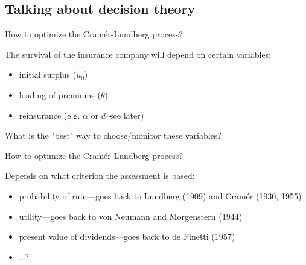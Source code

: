 \documentclass[11pt]{beamer}
\begin{document}
\subsection{Talking about decision theory}
\begin{frame}{How to optimize the Cram\'er-Lundberg process?}

The survival of the insurance company will depend on certain variables:
\vfill
\begin{itemize}
\item initial surplus ($u_0$)
\vfill
\item loading of premiums ($\theta$)
\vfill
\item reinsurance (e.g. $\alpha$ or $d$--see later)
\vfill
\end{itemize}
What is the "best" way to choose/monitor these variables? 

\end{frame}
\begin{frame}{How to optimize the Cram\'er-Lundberg process?}

Depends on what criterion the assessment is based:
\begin{itemize}
\item probability of ruin---goes back to Lundberg (1909) and Cram\'er (1930, 1955)

\vfill

\item utility---goes back to von Neumann and Morgenstern (1944)

\vfill

\item present value of dividends---goes back to de Finetti (1957)

\vfill

\item \ldots ?
\end{itemize}

\end{frame}
\end{document}
